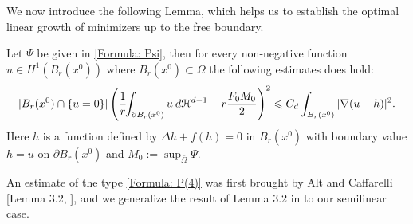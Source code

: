 \documentclass[11pt,reqno]{amsart}
\begin{document}
We now introduce the following Lemma, which helps us to establish the optimal linear growth of minimizers up to the free boundary.
\begin{lemma}\label{Lemma: An estimates}
	Let $\Psi$ be given in \eqref{Formula: Psi}, then for every non-negative function $u\in H^{1}(B_{r}(x^{0}))$ where $B_{r}(x^{0})\subset\Omega$ the following estimates does hold:
	\begin{align}\label{Formula: P(4)}
		|B_{r}(x^{0})\cap\{u=0\}|\left(\frac{1}{r}\dashint_{\partial B_{r}(x^{0})}u\:d\mathcal{H}^{d-1}-r\frac{F_{0}M_{0}}{2}\right)^{2}\leqslant C_{d}\int_{B_{r}(x^{0})}|\nabla(u-h)|^{2}.
	\end{align}
    Here $h$ is a function defined by $\Delta h+f(h)=0$ in $B_{r}(x^{0})$ with boundary value $h=u$ on $\partial B_{r}(x^{0})$ and $M_{0}:=\sup_{\bar{\Omega}}\Psi$.
\end{lemma}
\begin{remark}
	An estimate of the type \eqref{Formula: P(4)} was first brought by Alt and Caffarelli [Lemma 3.2, \cite{AC1981}], and we generalize the result of Lemma 3.2 in \cite{AC1981} to our semilinear case.
\end{remark}
\end{document}
